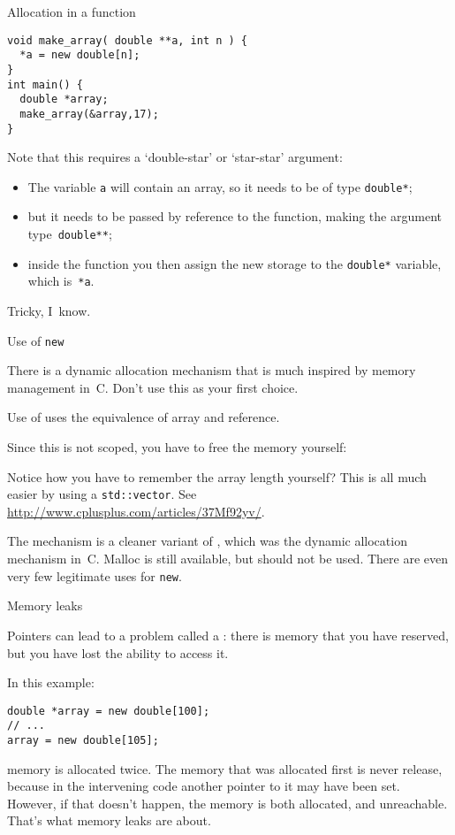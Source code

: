 \begin{block}{Allocation in a function}
\begin{lstlisting}
void make_array( double **a, int n ) {
  *a = new double[n];
}
int main() {
  double *array;
  make_array(&array,17);
}
\end{lstlisting}
\end{block}

Note that this requires a `double-star' or `star-star' argument:
\begin{itemize}
\item The variable \lstinline{a} will contain an array, so it needs to be of
  type \lstinline{double*};
\item but it needs to be passed by reference to the function, making
  the argument type~\lstinline{double**};
\item inside the function you then assign the new storage to the
  \lstinline{double*} variable, which is~\lstinline{*a}.
\end{itemize}
Tricky, I~know.

 {Use of \texttt{new}}
\label{sec:cnew}

\prerequisite{\ref{sec:arraypointer}}

There is a dynamic allocation mechanism that is much inspired by
memory management in~C. Don't use this as your first choice.

Use of  uses the 
equivalence of array and reference.
%

Since this is not scoped, you have to free the memory yourself:
%

Notice how you have to remember the array length yourself? This is all
much easier by using a \lstinline{std::vector}. See
\url{http://www.cplusplus.com/articles/37Mf92yv/}.

The  mechanism is a cleaner variant of ,
which was the dynamic allocation mechanism in~C. Malloc is still
available, but should not be used. There are even very few legitimate
uses for \lstinline{new}.


 {Memory leaks}
\label{sec:memleak}

Pointers can lead to a problem called a :
there is memory that you have reserved, but you have lost the ability
to access it.

In this example:
\begin{lstlisting}
double *array = new double[100];
// ...
array = new double[105];
\end{lstlisting}
memory is allocated twice. The memory that was allocated first is
never release, because in the intervening code another pointer to it
may have been set. However, if that doesn't happen, the memory is both
allocated, and unreachable. That's what memory leaks are about.

